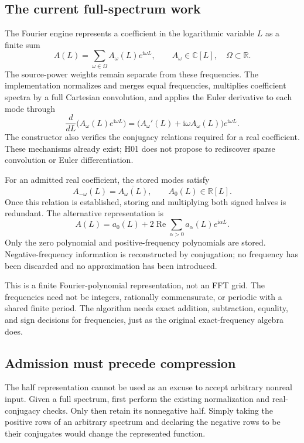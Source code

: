 \documentclass[11pt,letterpaper]{article}
\newcommand{\RR}{\mathbb R}
\newcommand{\CC}{\mathbb C}
\newcommand{\ii}{\mathrm i}
\begin{document}
\subsection{The current full-spectrum work}
The Fourier engine represents a coefficient in the logarithmic variable \(L\) as a finite sum
\begin{equation}\label{eq:fourier}
 A(L)=\sum_{\omega\in\Omega} A_\omega(L)e^{\ii\omega L},
 \qquad A_\omega\in\CC[L],\quad\Omega\subset\RR.
\end{equation}
The source-power weights remain separate from these frequencies. The implementation normalizes and merges equal frequencies, multiplies coefficient spectra by a full Cartesian convolution, and applies the Euler derivative to each mode through
\begin{equation}\label{eq:euler}
 \frac{d}{dL}\bigl(A_\omega(L)e^{\ii\omega L}\bigr)
  =\bigl(A_\omega'(L)+\ii\omega A_\omega(L)\bigr)e^{\ii\omega L}.
\end{equation}
The constructor also verifies the conjugacy relations required for a real coefficient. These mechanisms already exist; H01 does not propose to rediscover sparse convolution or Euler differentiation.\cite{fourier}

For an admitted real coefficient, the stored modes satisfy
\begin{equation}\label{eq:hermitian}
 A_{-\omega}(L)=\overline{A_\omega(L)},\qquad A_0(L)\in\RR[L].
\end{equation}
Once this relation is established, storing and multiplying both signed halves is redundant. The alternative representation is
\begin{equation}\label{eq:half}
 A(L)=a_0(L)+2\operatorname{Re}
       \sum_{\alpha>0}a_\alpha(L)e^{\ii\alpha L}.
\end{equation}
Only the zero polynomial and positive-frequency polynomials are stored. Negative-frequency information is reconstructed by conjugation; no frequency has been discarded and no approximation has been introduced.

This is a finite Fourier-polynomial representation, not an FFT grid. The frequencies need not be integers, rationally commensurate, or periodic with a shared finite period. The algorithm needs exact addition, subtraction, equality, and sign decisions for frequencies, just as the original exact-frequency algebra does.

\subsection{Admission must precede compression}
The half representation cannot be used as an excuse to accept arbitrary nonreal input. Given a full spectrum, first perform the existing normalization and real-conjugacy checks. Only then retain its nonnegative half. Simply taking the positive rows of an arbitrary spectrum and declaring the negative rows to be their conjugates would change the represented function.
\end{document}
